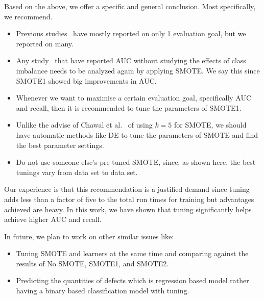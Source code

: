\documentclass[sigconf,review, anonymous]{acmart}
\newcommand{\bi}{\begin{itemize}[leftmargin=0.4cm]}
\newcommand{\ei}{\end{itemize}}
\theoremstyle{break}
\theoremstyle{break}
\begin{document}
Based on the above, we offer a specific and general conclusion. Most specifically, we recommend.
\bi
 \item Previous studies~\cite{ghotra2015revisiting,tantithamthavorn2016automated} have mostly reported on only 1 evaluation goal, but we reported on many.
 \item Any study~\cite{ghotra2015revisiting} that have reported AUC without studying the effects of class imbalance needs to be analyzed again by applying SMOTE. We say this since SMOTE1 showed big improvements in AUC.
 \item Whenever we want to maximise a certain evaluation goal, specifically AUC and recall, then it is recommended to tune the parameters of SMOTE1.
 \item Unlike the advise of Chawal et al.~\cite{chawla2002smote} of using $k=5$ for SMOTE, we should have automatic methods like DE to tune the parameters of SMOTE and find the best parameter settings.
 \item Do not use someone else's pre-tuned SMOTE, since, as shown here, the best tunings vary from data set to data set.
\ei

Our experience is that this recommendation is a justified demand since tuning adds less than a factor of five to the total run times for training but advantages achieved are heavy. In this work, we have shown that tuning significantly helps achieve higher AUC and recall.

In future, we plan to work on other similar issues like:
\bi
 \item Tuning SMOTE and learners at the same time and comparing against the results of No SMOTE, SMOTE1, and SMOTE2.
 \item Predicting the quantities of defects which is regression based model rather having a binary based classification model with tuning.
\ei

\balance


\medskip

\end{document}
